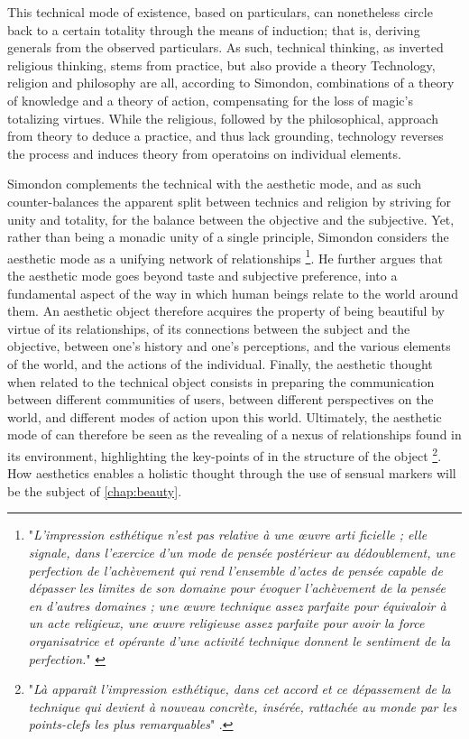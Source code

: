 This technical mode of existence, based on particulars, can nonetheless circle back to a certain totality through the means of induction; that is, deriving generals from the observed particulars. As such, technical thinking, as inverted religious thinking, stems from practice, but also provide a theory Technology, religion and philosophy are all, according to Simondon, combinations of a theory of knowledge and a theory of action, compensating for the loss of magic's totalizing virtues. While the religious, followed by the philosophical, approach from theory to deduce a practice, and thus lack grounding, technology reverses the process and induces theory from operatoins on individual elements.


Simondon complements the technical with the aesthetic mode, and as such counter-balances the apparent split between technics and religion by striving for unity and totality, for the balance between the objective and the subjective. Yet, rather than being a monadic unity of a single principle, Simondon considers the aesthetic mode as a unifying network of relationships \footnote{"\emph{L'impression esthétique n'est pas relative à une œuvre arti
ficielle ; elle signale, dans l'exercice d'un mode de pensée postérieur au dédoublement, une perfection de l'achèvement qui rend l'ensemble d'actes de pensée capable de dépasser les limites de son domaine pour évoquer l'achèvement de la pensée en d'autres domaines ; une œuvre technique assez parfaite pour équivaloir à un acte religieux, une œuvre religieuse assez parfaite pour avoir la force organisatrice et opérante d'une activité technique donnent le sentiment de la perfection.}" \citep{simondon_mode_1958}}. He further argues that the aesthetic mode goes beyond taste and subjective preference, into a fundamental aspect of the way in which human beings relate to the world around them. An aesthetic object therefore acquires the property of being beautiful by virtue of its relationships, of its connections between the subject and the objective, between one's history and one's perceptions, and the various elements of the world, and the actions of the individual. Finally, the aesthetic thought when related to the technical object consists in preparing the communication between different communities of users, between different perspectives on the world, and different modes of action upon this world. Ultimately, the aesthetic mode of can therefore be seen as the revealing of a nexus of relationships found in its environment, highlighting the key-points of in the structure of the object \footnote{"\emph{Là apparaît l'impression esthétique, dans cet accord et ce dépassement de la technique qui devient à nouveau concrète, insérée, rattachée au monde par les points-clefs les plus remarquables}" \citep{simondon_mode_1958}.}. How aesthetics enables a holistic thought through the use of sensual markers will be the subject of \ref{chap:beauty}.

